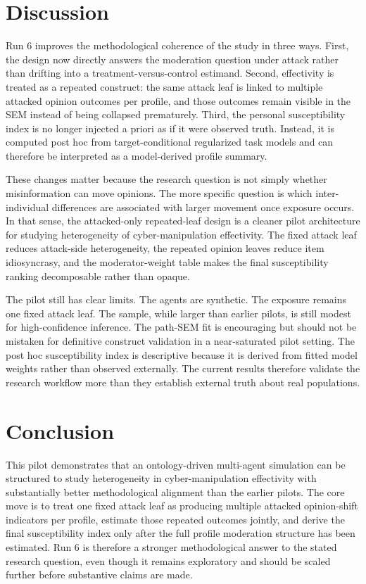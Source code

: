 \documentclass[11pt]{article}
\begin{document}
\section{Discussion}
Run 6 improves the methodological coherence of the study in three ways. First, the design now directly answers the moderation question under attack rather than drifting into a treatment-versus-control estimand. Second, effectivity is treated as a repeated construct: the same attack leaf is linked to multiple attacked opinion outcomes per profile, and those outcomes remain visible in the SEM instead of being collapsed prematurely. Third, the personal susceptibility index is no longer injected a priori as if it were observed truth. Instead, it is computed post hoc from target-conditional regularized task models and can therefore be interpreted as a model-derived profile summary.

These changes matter because the research question is not simply whether misinformation can move opinions. The more specific question is which inter-individual differences are associated with larger movement once exposure occurs. In that sense, the attacked-only repeated-leaf design is a cleaner pilot architecture for studying heterogeneity of cyber-manipulation effectivity. The fixed attack leaf reduces attack-side heterogeneity, the repeated opinion leaves reduce item idiosyncrasy, and the moderator-weight table makes the final susceptibility ranking decomposable rather than opaque.

The pilot still has clear limits. The agents are synthetic. The exposure remains one fixed attack leaf. The sample, while larger than earlier pilots, is still modest for high-confidence inference. The path-SEM fit is encouraging but should not be mistaken for definitive construct validation in a near-saturated pilot setting. The post hoc susceptibility index is descriptive because it is derived from fitted model weights rather than observed externally. The current results therefore validate the research workflow more than they establish external truth about real populations.

\section{Conclusion}
This pilot demonstrates that an ontology-driven multi-agent simulation can be structured to study heterogeneity in cyber-manipulation effectivity with substantially better methodological alignment than the earlier pilots. The core move is to treat one fixed attack leaf as producing multiple attacked opinion-shift indicators per profile, estimate those repeated outcomes jointly, and derive the final susceptibility index only after the full profile moderation structure has been estimated. Run 6 is therefore a stronger methodological answer to the stated research question, even though it remains exploratory and should be scaled further before substantive claims are made.
\end{document}
